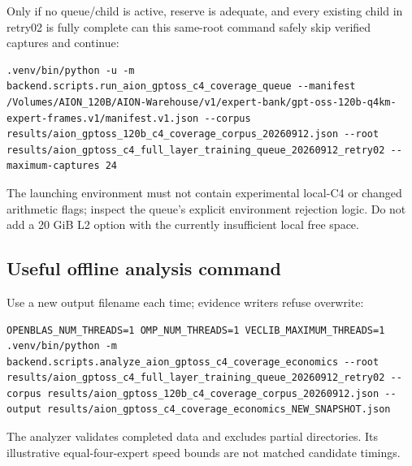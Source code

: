 \documentclass[11pt,a4paper]{article}
\begin{document}
Only if no queue/child is active, reserve is adequate, and every existing child
in retry02 is fully complete can this same-root command safely skip verified
captures and continue:
\begin{lstlisting}
.venv/bin/python -u -m backend.scripts.run_aion_gptoss_c4_coverage_queue --manifest /Volumes/AION_120B/AION-Warehouse/v1/expert-bank/gpt-oss-120b-q4km-expert-frames.v1/manifest.v1.json --corpus results/aion_gptoss_120b_c4_coverage_corpus_20260912.json --root results/aion_gptoss_c4_full_layer_training_queue_20260912_retry02 --maximum-captures 24
\end{lstlisting}
The launching environment must not contain experimental local-C4 or changed
arithmetic flags; inspect the queue's explicit environment rejection logic.
Do not add a 20 GiB L2 option with the currently insufficient local free space.

\subsection{Useful offline analysis command}
Use a new output filename each time; evidence writers refuse overwrite:
\begin{lstlisting}
OPENBLAS_NUM_THREADS=1 OMP_NUM_THREADS=1 VECLIB_MAXIMUM_THREADS=1 .venv/bin/python -m backend.scripts.analyze_aion_gptoss_c4_coverage_economics --root results/aion_gptoss_c4_full_layer_training_queue_20260912_retry02 --corpus results/aion_gptoss_120b_c4_coverage_corpus_20260912.json --output results/aion_gptoss_c4_coverage_economics_NEW_SNAPSHOT.json
\end{lstlisting}
The analyzer validates completed data and excludes partial directories. Its
illustrative equal-four-expert speed bounds are not matched candidate timings.
\end{document}
